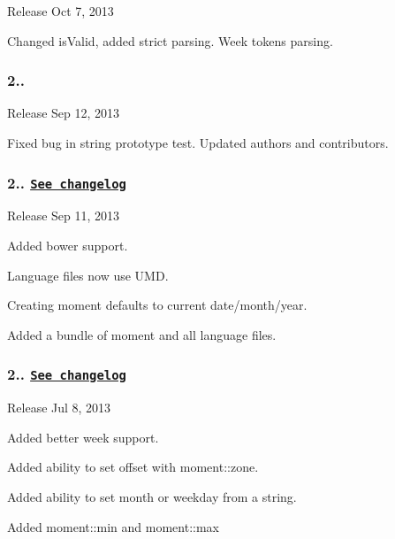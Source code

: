\begin{DoxyItemize}
\item Release Oct 7, 2013
\end{DoxyItemize}

Changed is\+Valid, added strict parsing. Week tokens parsing.

\subsubsection*{2..}


\begin{DoxyItemize}
\item Release Sep 12, 2013
\end{DoxyItemize}

Fixed bug in string prototype test. Updated authors and contributors.

\subsubsection*{2.. \href{https://gist.github.com/ichernev/00f837a9baf46a3565e4}{\tt See changelog}}


\begin{DoxyItemize}
\item Release Sep 11, 2013
\end{DoxyItemize}

Added bower support.

Language files now use U\+MD.

Creating moment defaults to current date/month/year.

Added a bundle of moment and all language files.

\subsubsection*{2.. \href{https://gist.github.com/timrwood/b8c2d90d528eddb53ab5}{\tt See changelog}}


\begin{DoxyItemize}
\item Release Jul 8, 2013
\end{DoxyItemize}

Added better week support.

Added ability to set offset with {\ttfamily moment\+::zone}.

Added ability to set month or weekday from a string.

Added {\ttfamily moment\+::min} and {\ttfamily moment\+::max}

